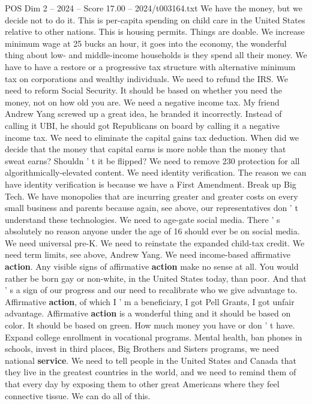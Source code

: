 \begin{textsample}{POS Dim 2 – 2024 – Score 17.00 – 2024/t003164.txt}
We have the money, but we decide not to do it.
This is per-capita spending on child care in the United States relative to other nations.
This is housing permits.
Things are doable.
We increase minimum wage at 25 bucks an hour, it goes into the economy, the wonderful thing about low- and middle-income households is they spend all their money.
We have to have a restore or a progressive tax structure with alternative minimum tax on corporations and wealthy individuals.
We need to refund the IRS.
We need to reform Social Security.
It should be based on whether you need the money, not on how old you are.
We need a negative income tax.
My friend Andrew Yang screwed up a great idea, he branded it incorrectly.
Instead of calling it UBI, he should got Republicans on board by calling it a negative income tax.
We need to eliminate the capital gains tax deduction.
When did we decide that the money that capital earns is more noble than the money that sweat earns?
Shouldn ' t it be flipped?
We need to remove 230 protection for all algorithmically-elevated content.
We need identity verification.
The reason we can have identity verification is because we have a First Amendment.
Break up Big Tech.
We have monopolies that are incurring greater and greater costs on every small business and parents because again, see above, our representatives don ' t understand these technologies.
We need to age-gate social media.
There ' s absolutely no reason anyone under the age of 16 should ever be on social media.
We need universal pre-K.
We need to reinstate the expanded child-tax credit.
We need term limits, see above, Andrew Yang.
We need income-based affirmative \textbf{action}.
Any visible signs of affirmative \textbf{action} make no sense at all.
You would rather be born gay or non-white, in the United States today, than poor.
And that ' s a sign of our progress and our need to recalibrate who we give advantage to.
Affirmative \textbf{action}, of which I ' m a beneficiary, I got Pell Grants, I got unfair advantage.
Affirmative \textbf{action} is a wonderful thing and it should be based on color.
It should be based on green.
How much money you have or don ' t have.
Expand college enrollment in vocational programs.
Mental health, ban phones in schools, invest in third places, Big Brothers and Sisters programs, we need national \textbf{service}.
We need to tell people in the United States and Canada that they live in the greatest countries in the world, and we need to remind them of that every day by exposing them to other great Americans where they feel connective tissue.
We can do all of this.

\end{textsample}
